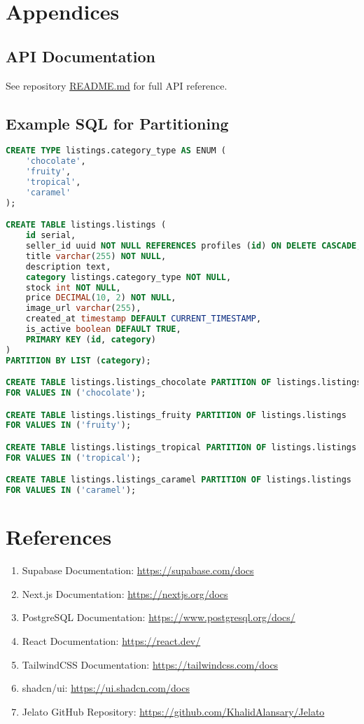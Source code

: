 \documentclass[12pt,a4paper]{report}
\begin{document}
\chapter{Appendices}
\section{API Documentation}
See repository \href{https://github.com/KhalidAlansary/Jelato}{README.md} for full API reference.

\section{Example SQL for Partitioning}

\begin{lstlisting}[language=SQL, basicstyle=\ttfamily\small, frame=single, caption={SQL code for partitioned listings table}]
CREATE TYPE listings.category_type AS ENUM (
    'chocolate',
    'fruity',
    'tropical',
    'caramel'
);

CREATE TABLE listings.listings (
    id serial,
    seller_id uuid NOT NULL REFERENCES profiles (id) ON DELETE CASCADE,
    title varchar(255) NOT NULL,
    description text,
    category listings.category_type NOT NULL,
    stock int NOT NULL,
    price DECIMAL(10, 2) NOT NULL,
    image_url varchar(255),
    created_at timestamp DEFAULT CURRENT_TIMESTAMP,
    is_active boolean DEFAULT TRUE,
    PRIMARY KEY (id, category)
)
PARTITION BY LIST (category);

CREATE TABLE listings.listings_chocolate PARTITION OF listings.listings
FOR VALUES IN ('chocolate');

CREATE TABLE listings.listings_fruity PARTITION OF listings.listings
FOR VALUES IN ('fruity');

CREATE TABLE listings.listings_tropical PARTITION OF listings.listings
FOR VALUES IN ('tropical');

CREATE TABLE listings.listings_caramel PARTITION OF listings.listings
FOR VALUES IN ('caramel');
\end{lstlisting}

\chapter{References}
\begin{enumerate}
    \item Supabase Documentation: \url{https://supabase.com/docs}
    \item Next.js Documentation: \url{https://nextjs.org/docs}
    \item PostgreSQL Documentation: \url{https://www.postgresql.org/docs/}
    \item React Documentation: \url{https://react.dev/}
    \item TailwindCSS Documentation: \url{https://tailwindcss.com/docs}
    \item shadcn/ui: \url{https://ui.shadcn.com/docs}
    \item Jelato GitHub Repository: \url{https://github.com/KhalidAlansary/Jelato}
\end{enumerate}
\end{document}
